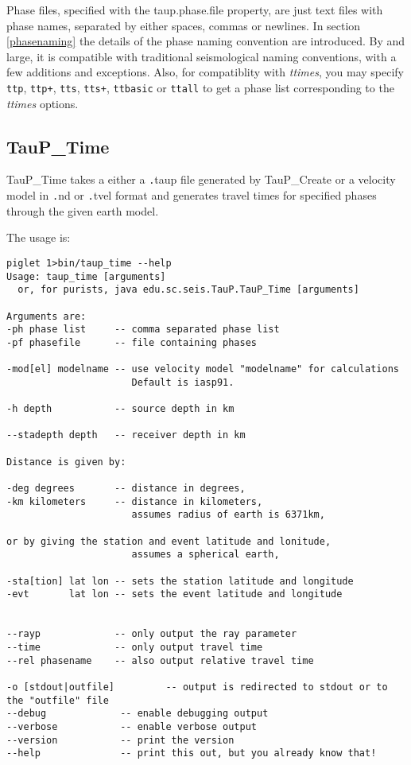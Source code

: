 Phase files, specified with the taup.phase.file property,
 are just text files with phase names, separated by either 
spaces, commas or newlines. In section \ref{phasenaming} the details of 
the phase naming convention are introduced. 
By and large, it is compatible with traditional 
seismological naming conventions, with a few additions and exceptions.
Also, for compatiblity with \textit{ttimes}, you may specify 
\texttt{ttp}, \texttt{ttp+}, \texttt{tts}, \texttt{tts+},
\texttt{ttbasic} or \texttt{ttall} to get a phase list corresponding 
to the \textit{ttimes} options.

\subsection{TauP\_Time}
TauP\_Time takes a either a {\texttt .taup} file generated by TauP\_Create or a velocity model in
{\texttt .nd} or {\texttt .tvel} format and generates 
travel times for specified phases through the given earth model. 

The usage is:
\begin{verbatim}
piglet 1>bin/taup_time --help
Usage: taup_time [arguments]
  or, for purists, java edu.sc.seis.TauP.TauP_Time [arguments]

Arguments are:
-ph phase list     -- comma separated phase list
-pf phasefile      -- file containing phases

-mod[el] modelname -- use velocity model "modelname" for calculations
                      Default is iasp91.

-h depth           -- source depth in km

--stadepth depth   -- receiver depth in km

Distance is given by:

-deg degrees       -- distance in degrees,
-km kilometers     -- distance in kilometers,
                      assumes radius of earth is 6371km,

or by giving the station and event latitude and lonitude,
                      assumes a spherical earth,

-sta[tion] lat lon -- sets the station latitude and longitude
-evt       lat lon -- sets the event latitude and longitude


--rayp             -- only output the ray parameter
--time             -- only output travel time
--rel phasename    -- also output relative travel time

-o [stdout|outfile]         -- output is redirected to stdout or to the "outfile" file
--debug             -- enable debugging output
--verbose           -- enable verbose output
--version           -- print the version
--help              -- print this out, but you already know that!
\end{verbatim} 

